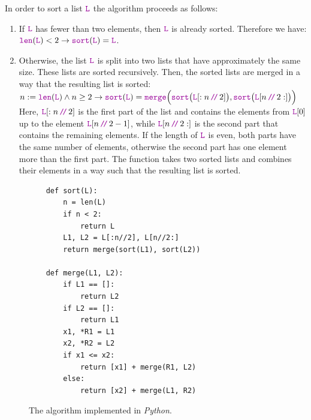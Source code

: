 In order to sort a list $\mytt{L}$ the algorithm proceeds as follows:
\begin{enumerate}
\item If $\mytt{L}$ has fewer than two elements, then $\mytt{L}$ is already sorted.  Therefore we have: 
      \\[0.2cm]
      \hspace*{0.3cm}
      $\mytt{len}(\mytt{L}) < 2 \rightarrow \mytt{sort}(\mytt{L}) = \mytt{L}$.
\item Otherwise, the list $\mytt{L}$ is split into two lists that have approximately the same size.
      These lists are sorted recursively.  Then, the sorted lists are merged in a way that the
      resulting list is sorted: \\[0.2cm]
      \hspace*{0.3cm} 
      $n := \mytt{len}(\mytt{L}) \wedge n \geq 2 \rightarrow \mytt{sort}(\mytt{L}) =
         \mytt{merge}\Bigl(\mytt{sort}\bigl(\mytt{L}[:n\dv 2]\bigr),
         \mytt{sort}\bigl(\mytt{L}[n\dv 2:]\bigr)\Bigr)
     $
      \\[0.2cm]
      Here,  $\mytt{L}[:n\dv 2]$ is the first part of the list and contains the elements from $\mytt{L}[0]$ up
      to the element $\mytt{L}[n\dv 2-1]$, while
      $\mytt{L}[n\dv 2:]$ is the second part that contains the remaining elements.  If the length of $\mytt{L}$ is
      even, both parts have the same number of elements, otherwise the second part has one element more than the
      first part.  The function  takes two sorted lists and combines their elements in a way such that
      the resulting list is sorted. 
\end{enumerate}


\begin{figure}[!ht]
  \centering
\begin{verbatim}
    def sort(L):
        n = len(L)
        if n < 2:
            return L
        L1, L2 = L[:n//2], L[n//2:]
        return merge(sort(L1), sort(L2))
    
    def merge(L1, L2):
        if L1 == []:
            return L2
        if L2 == []:
            return L1
        x1, *R1 = L1
        x2, *R2 = L2
        if x1 <= x2:
            return [x1] + merge(R1, L2)
        else:
            return [x2] + merge(L1, R2)
\end{verbatim}
\vspace*{-0.3cm}
  \caption{The  algorithm implemented in \textsl{Python}.}
  \label{fig:merge-sort.stlx}
\end{figure}


